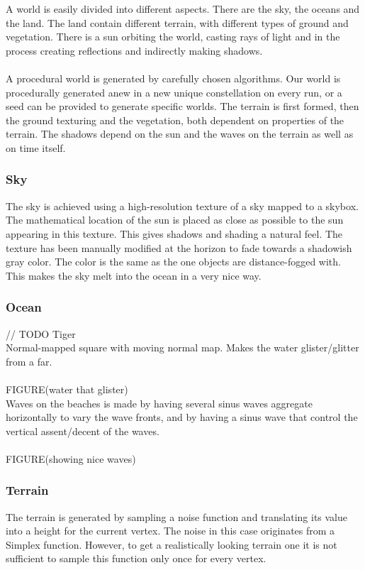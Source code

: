 
A world is easily divided into different aspects. There are the sky, the oceans and the land. The land contain different terrain, with different types of ground and vegetation. There is a sun orbiting the world, casting rays of light and in the process creating reflections and indirectly making shadows.\\
\\
A procedural world is generated by carefully chosen algorithms. Our world is procedurally generated anew in a new unique constellation on every run, or a seed can be provided to generate specific worlds. The terrain is first formed, then the ground texturing and the vegetation, both dependent on properties of the terrain. The shadows depend on the sun and the waves on the terrain as well as on time itself.

\subsubsection{Sky}
The sky is achieved using a high-resolution texture of a sky mapped to a skybox. The mathematical location of the sun is placed as close as possible to the sun appearing in this texture. This gives shadows and shading a natural feel. The texture has been manually modified at the horizon to fade towards a shadowish gray color. The color is the same as the one objects are distance-fogged with. This makes the sky melt into the ocean in a very nice way. 

\subsubsection{Ocean}
// TODO  Tiger \\
Normal-mapped square with moving normal map. Makes the water glister/glitter from a far.\\\\
FIGURE(water that glister)
\\
Waves on the beaches is made by having several sinus waves aggregate horizontally to vary the wave fronts, and by having a sinus wave that control the vertical assent/decent of the waves.\\
\\
FIGURE(showing nice waves)

\newpage
\subsubsection{Terrain}
The terrain is generated by sampling a noise function and translating its value into a height for the current vertex. The noise in this case originates from a Simplex function. However, to get a realistically looking terrain one it is not sufficient to sample this function only once for every vertex.

